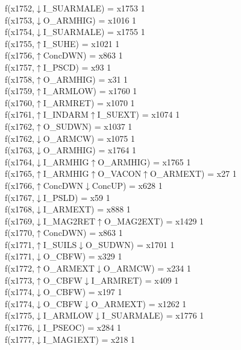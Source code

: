 f(x1752,$\downarrow$I\_SUARMALE) = x1753 {1} \\
f(x1753,$\downarrow$O\_ARMHIG) = x1016 {1} \\
f(x1754,$\downarrow$I\_SUARMALE) = x1755 {1} \\
f(x1755,$\uparrow$I\_SUHE) = x1021 {1} \\
f(x1756,$\uparrow$ConcDWN) = x863 {1} \\
f(x1757,$\uparrow$I\_PSCD) = x93 {1} \\
f(x1758,$\uparrow$O\_ARMHIG) = x31 {1} \\
f(x1759,$\uparrow$I\_ARMLOW) = x1760 {1} \\
f(x1760,$\uparrow$I\_ARMRET) = x1070 {1} \\
f(x1761,$\uparrow$I\_INDARM$\uparrow$I\_SUEXT) = x1074 {1} \\
f(x1762,$\uparrow$O\_SUDWN) = x1037 {1} \\
f(x1762,$\downarrow$O\_ARMCW) = x1075 {1} \\
f(x1763,$\downarrow$O\_ARMHIG) = x1764 {1} \\
f(x1764,$\downarrow$I\_ARMHIG$\uparrow$O\_ARMHIG) = x1765 {1} \\
f(x1765,$\uparrow$I\_ARMHIG$\uparrow$O\_VACON$\uparrow$O\_ARMEXT) = x27 {1} \\
f(x1766,$\uparrow$ConcDWN$\downarrow$ConcUP) = x628 {1} \\
f(x1767,$\downarrow$I\_PSLD) = x59 {1} \\
f(x1768,$\downarrow$I\_ARMEXT) = x888 {1} \\
f(x1769,$\downarrow$I\_MAG2RET$\uparrow$O\_MAG2EXT) = x1429 {1} \\
f(x1770,$\uparrow$ConcDWN) = x863 {1} \\
f(x1771,$\uparrow$I\_SUILS$\downarrow$O\_SUDWN) = x1701 {1} \\
f(x1771,$\downarrow$O\_CBFW) = x329 {1} \\
f(x1772,$\uparrow$O\_ARMEXT$\downarrow$O\_ARMCW) = x234 {1} \\
f(x1773,$\uparrow$O\_CBFW$\downarrow$I\_ARMRET) = x409 {1} \\
f(x1774,$\downarrow$O\_CBFW) = x197 {1} \\
f(x1774,$\downarrow$O\_CBFW$\downarrow$O\_ARMEXT) = x1262 {1} \\
f(x1775,$\downarrow$I\_ARMLOW$\downarrow$I\_SUARMALE) = x1776 {1} \\
f(x1776,$\downarrow$I\_PSEOC) = x284 {1} \\
f(x1777,$\downarrow$I\_MAG1EXT) = x218 {1} \\
